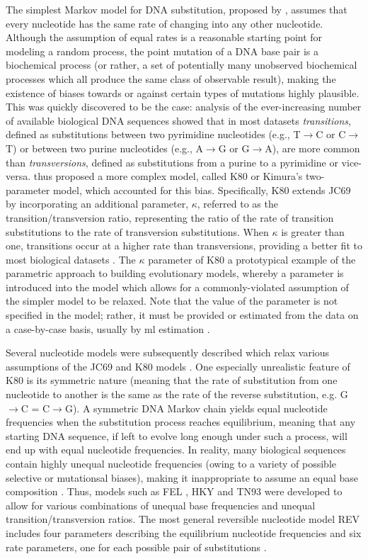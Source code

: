The simplest Markov model for DNA substitution, proposed by
\citet{Jukes1969a}, assumes that every nucleotide has the same rate of
changing into any other nucleotide. Although the assumption of equal
rates is a reasonable starting point for modeling a random process,
the point mutation of a DNA base pair is a biochemical process (or
rather, a set of potentially many unobserved biochemical processes
which all produce the same class of observable result), making the
existence of biases towards or against certain types of mutations
highly plausible. This was quickly discovered to be the case: analysis
of the ever-increasing number of available biological DNA sequences
showed that in most datasets \emph{transitions}, defined as
substitutions between two pyrimidine nucleotides (e.g., T$\to$C or
C$\to$T) or between two purine nucleotides (e.g., A$\to$G or G$\to$A),
are more common than \emph{transversions}, defined as substitutions
from a purine to a pyrimidine or vice-versa. \citet{Kimura1980} thus
proposed a more complex model, called K80 or Kimura's two-parameter
model, which accounted for this bias. Specifically, K80 extends JC69
by incorporating an additional parameter, $\kappa$, referred to as the
transition/transversion ratio, representing the ratio of the rate of
transition substitutions to the rate of transversion
substitutions. When $\kappa$ is greater than one, transitions occur at
a higher rate than transversions, providing a better fit to most
biological datasets \citep{Brown1982}. The $\kappa$ parameter of K80 a
prototypical example of the parametric approach to building
evolutionary models, whereby a parameter is introduced into the model
which allows for a commonly-violated assumption of the simpler model
to be relaxed. Note that the value of the parameter is not specified
in the model; rather, it must be provided or estimated from the data
on a case-by-case basis, usually by \ac{ml} estimation
\citep{Whelan2001}.

Several nucleotide models were subsequently described which relax
various assumptions of the JC69 and K80 models
\citep{Whelan2001,Yang2006}. One especially unrealistic feature of K80
is its symmetric nature (meaning that the rate of substitution from
one nucleotide to another is the same as the rate of the reverse
substitution, e.g. G$\to$C = C$\to$G). A symmetric DNA Markov chain
yields equal nucleotide frequencies when the substitution process
reaches equilibrium, meaning that any starting DNA sequence, if left
to evolve long enough under such a process, will end up with equal
nucleotide frequencies. In reality, many biological sequences contain
highly unequal nucleotide frequencies (owing to a variety of possible
selective or mutationsal biases), making it inappropriate to assume an
equal base composition \citep{Yang2006}. Thus, models such as FEL
\citep{Felsenstein1981a}, HKY \citep{Hasegawa1985} and TN93
\citep{Tamura1993} were developed to allow for various combinations of
unequal base frequencies and unequal transition/transversion
ratios. The most general reversible nucleotide model REV includes four
parameters describing the equilibrium nucleotide frequencies and six
rate parameters, one for each possible pair of substitutions
\citep{Tavare1986}.

